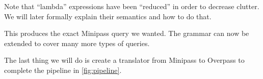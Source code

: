 \documentclass[main.tex]{subfiles}
\begin{document}
Note that ``lambda'' expressions have been ``reduced'' in order to decrease
clutter. We will later formally explain their semantics and how to do that.

This produces the exact Minipass query we wanted. The grammar can now be extended
to cover many more types of queries.

The last thing we will do is create a translator from Minipass to Overpass
to complete the pipeline in \cref{fig:pipeline}.

\end{document}

